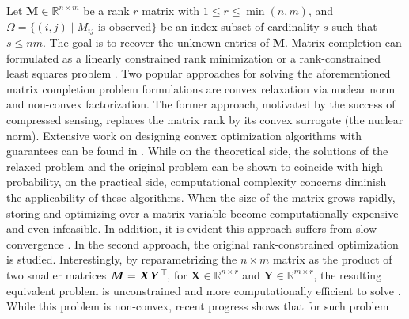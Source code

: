 \documentclass{article}
\def\R{{\mathbb R}}
\newcommand{\hlnew}[1]{{#1}}
\newcommand{\topnew}{\top \hspace{-0.05cm}}
\begin{document}

Let $\bm M \in \R^{n \times m}$ be a rank $r$ matrix with \hlnew{$1 \leq r \leq \min(n,m)$}, and $\Omega = \{ (i,j) \mid M_{ij} \text{ is observed} \}$ be an index subset of cardinality $s$ such that $s \leq nm$. The goal is to recover the unknown entries of $\bm M$. Matrix completion can formulated as a linearly constrained rank minimization or a rank-constrained least squares problem \cite{candes2009exact}. Two popular approaches for solving the aforementioned matrix completion problem formulations are convex relaxation via nuclear norm and non-convex factorization. The former approach, motivated by the \hlnew{success} of compressed sensing, replaces the matrix rank by its convex surrogate (the nuclear norm). Extensive work on designing convex optimization algorithms with guarantees can be found in \cite{candes2009exact,ji2009accelerated,toh2010accelerated,cai2010singular,ma2011fixed}. 
While on the theoretical side, the solutions of the relaxed problem and the original problem can be shown to coincide with high probability, on the practical side, computational complexity concerns \hlnew{diminish} the applicability of these algorithms. When the size of the matrix grows rapidly, storing and optimizing over a matrix variable become computationally expensive and even infeasible. In addition, it is evident this approach suffers from slow convergence \cite{koren2009bellkor,vu2019accelerating}. 
In the second approach, the original rank-constrained optimization is studied. Interestingly, by reparametrizing the $n \times m$ matrix as the product of two smaller matrices $\bm M = \bm X \bm Y^\topnew$, for $\bm X \in \R^{n \times r}$ and $\bm Y \in \R^{m \times r}$, the resulting equivalent problem is unconstrained and more computationally efficient to solve \cite{burer2005local}. While this problem is non-convex, recent progress shows that for such problem 
\end{document}
